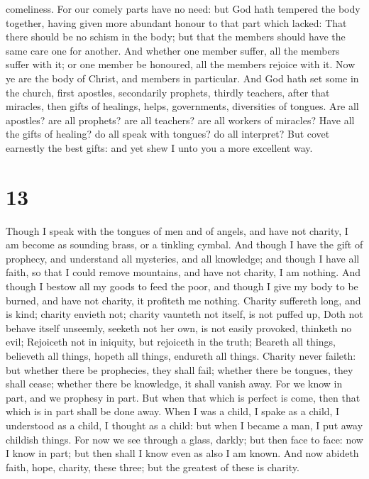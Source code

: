 comeliness.  For our comely parts have no need: but God
hath tempered the body together, having given more abundant honour to
that part which lacked:  That there should be no schism in
the body; but that the members should have the same care one for
another.  And whether one member suffer, all the members
suffer with it; or one member be honoured, all the members rejoice with
it.  Now ye are the body of Christ, and members in
particular.  And God hath set some in the church, first
apostles, secondarily prophets, thirdly teachers, after that miracles,
then gifts of healings, helps, governments, diversities of tongues.
 Are all apostles? are all prophets? are all teachers? are
all workers of miracles?  Have all the gifts of healing? do
all speak with tongues? do all interpret?  But covet
earnestly the best gifts: and yet shew I unto you a more excellent way.

\hypertarget{section-12}{%
\section{13}\label{section-12}}

 Though I speak with the tongues of men and of angels, and
have not charity, I am become as sounding brass, or a tinkling cymbal.
 And though I have the gift of prophecy, and understand all
mysteries, and all knowledge; and though I have all faith, so that I
could remove mountains, and have not charity, I am nothing. 
And though I bestow all my goods to feed the poor, and though I give my
body to be burned, and have not charity, it profiteth me nothing.
 Charity suffereth long, and is kind; charity envieth not;
charity vaunteth not itself, is not puffed up,  Doth not
behave itself unseemly, seeketh not her own, is not easily provoked,
thinketh no evil;  Rejoiceth not in iniquity, but rejoiceth
in the truth;  Beareth all things, believeth all things,
hopeth all things, endureth all things.  Charity never
faileth: but whether there be prophecies, they shall fail; whether there
be tongues, they shall cease; whether there be knowledge, it shall
vanish away.  For we know in part, and we prophesy in part.
 But when that which is perfect is come, then that which is
in part shall be done away.  When I was a child, I spake as
a child, I understood as a child, I thought as a child: but when I
became a man, I put away childish things.  For now we see
through a glass, darkly; but then face to face: now I know in part; but
then shall I know even as also I am known.  And now abideth
faith, hope, charity, these three; but the greatest of these is charity.


